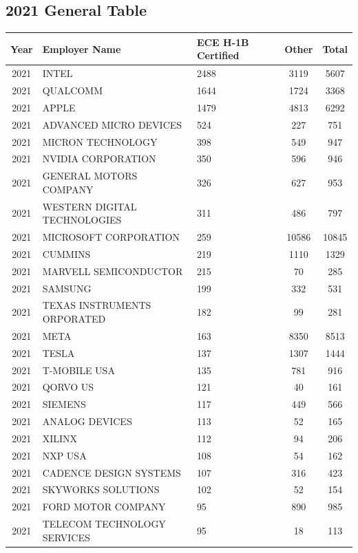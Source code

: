 \documentclass{article}%
\begin{document}
\subsection{2021 General Table}%
\label{subsec:2021GeneralTable}%
\begin{longtable}{c|p{20em}|p{5em}|c|c}%
\hline%
Year&Employer Name&ECE \newline%
 H{-}1B \newline%
 Certified&Other&Total\\%
\hline%
2021&INTEL&2488&3119&5607\\%
\hline%
2021&QUALCOMM&1644&1724&3368\\%
\hline%
2021&APPLE&1479&4813&6292\\%
\hline%
2021&ADVANCED MICRO DEVICES&524&227&751\\%
\hline%
2021&MICRON TECHNOLOGY&398&549&947\\%
\hline%
2021&NVIDIA CORPORATION&350&596&946\\%
\hline%
2021&GENERAL MOTORS COMPANY&326&627&953\\%
\hline%
2021&WESTERN DIGITAL TECHNOLOGIES&311&486&797\\%
\hline%
2021&MICROSOFT CORPORATION&259&10586&10845\\%
\hline%
2021&CUMMINS&219&1110&1329\\%
\hline%
2021&MARVELL SEMICONDUCTOR&215&70&285\\%
\hline%
2021&SAMSUNG&199&332&531\\%
\hline%
2021&TEXAS INSTRUMENTS ORPORATED&182&99&281\\%
\hline%
2021&META&163&8350&8513\\%
\hline%
2021&TESLA&137&1307&1444\\%
\hline%
2021&T{-}MOBILE USA&135&781&916\\%
\hline%
2021&QORVO US&121&40&161\\%
\hline%
2021&SIEMENS&117&449&566\\%
\hline%
2021&ANALOG DEVICES&113&52&165\\%
\hline%
2021&XILINX&112&94&206\\%
\hline%
2021&NXP USA&108&54&162\\%
\hline%
2021&CADENCE DESIGN SYSTEMS&107&316&423\\%
\hline%
2021&SKYWORKS SOLUTIONS&102&52&154\\%
\hline%
2021&FORD MOTOR COMPANY&95&890&985\\%
\hline%
2021&TELECOM TECHNOLOGY SERVICES&95&18&113\\%

\end{longtable}
\end{document}
